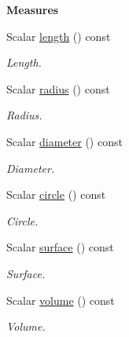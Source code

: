 \begin{Indent}{\bf Measures}\par
\begin{DoxyCompactItemize}
\item 
Scalar \hyperlink{exceptionCone_acef26d62a63179268e81b9ca5640daed}{length} () const 
\begin{DoxyCompactList}\small\item\em Length. \end{DoxyCompactList}\item 
Scalar \hyperlink{exceptionCone_aca98ec9ca8793bbe0556f6538806f3e5}{radius} () const 
\begin{DoxyCompactList}\small\item\em Radius. \end{DoxyCompactList}\item 
Scalar \hyperlink{exceptionCone_adfc26d582942165b4cb857e3baa3fad6}{diameter} () const 
\begin{DoxyCompactList}\small\item\em Diameter. \end{DoxyCompactList}\item 
Scalar \hyperlink{exceptionCone_a42c8b091a9ebec9b4f5b5807a6c1c332}{circle} () const 
\begin{DoxyCompactList}\small\item\em Circle. \end{DoxyCompactList}\item 
Scalar \hyperlink{exceptionCone_a48be13b713e8b2190e3a79abe3b8761a}{surface} () const 
\begin{DoxyCompactList}\small\item\em Surface. \end{DoxyCompactList}\item 
Scalar \hyperlink{exceptionCone_a57b5c860b35acba399aacb55e01938ba}{volume} () const 
\begin{DoxyCompactList}\small\item\em Volume. \end{DoxyCompactList}\end{DoxyCompactItemize}
\end{Indent}

